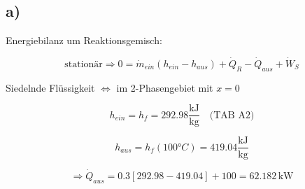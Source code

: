 

\subsection*{a)}

Energiebilanz um Reaktionsgemisch:

\[
\text{stationär} \Rightarrow 0 = \dot{m}_{ein} \left( h_{ein} - h_{aus} \right) + \dot{Q}_R - \dot{Q}_{aus} + \dot{W}_S
\]

Siedelnde Flüssigkeit \(\Leftrightarrow\) im 2-Phasengebiet mit \(x = 0\)

\[
h_{ein} = h_f = 292.98 \frac{\text{kJ}}{\text{kg}} \quad \text{(TAB A2)}
\]

\[
h_{aus} = h_f(100°C) = 419.04 \frac{\text{kJ}}{\text{kg}}
\]

\[
\Rightarrow \dot{Q}_{aus} = 0.3 \left[ 292.98 - 419.04 \right] + 100 = 62.182 \, \text{kW}
\]